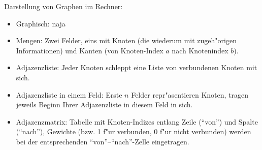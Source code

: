 \problem Darstellung von Graphen im Rechner:{
  \begin{itemize}
    \item Graphisch: naja
    \item Mengen: Zwei Felder, eins mit Knoten (die wiederum mit 
      zugeh"origen Informationen) und Kanten (von Knoten-Index $a$ nach
      Knotenindex $b$).
    \item Adjazenzliste: Jeder Knoten schleppt eine Liste von verbundenen
      Knoten mit sich.
    \item Adjazenzliste in einem Feld: Erste $n$ Felder repr"asentieren Knoten,
      tragen jeweils Beginn Ihrer Adjazenzliste in diesem Feld in sich.
    \item Adjazenzmatrix: Tabelle mit Knoten-Indizes entlang Zeile (``von'')
      und Spalte (``nach''), Gewichte (bzw. 1 f"ur verbunden, 0 f"ur nicht 
      verbunden) werden bei der entsprechenden ``von''--``nach''-Zelle
      eingetragen.
  \end{itemize}
}
